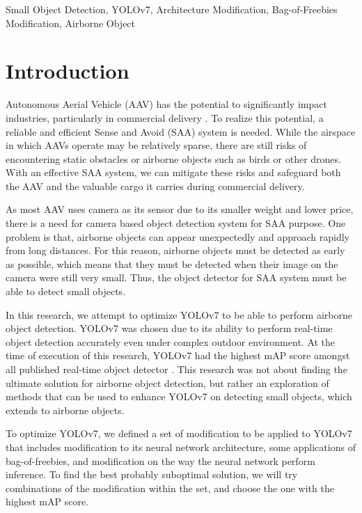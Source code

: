 \documentclass[conference]{IEEEtran}
\begin{document}
\begin{IEEEkeywords}
Small Object Detection, YOLOv7, Architecture Modification, Bag-of-Freebies Modification, Airborne Object
\end{IEEEkeywords}

\section{Introduction}

Autonomous Aerial Vehicle (AAV) has the potential to significantly impact industries, particularly in commercial delivery \cite{prime_air}.
To realize this potential, a reliable and efficient Sense and Avoid (SAA) system is needed.
While the airspace in which AAVs operate may be relatively sparse, there are still risks of encountering static obstacles or airborne objects such as birds or other drones.
With an effective SAA system, we can mitigate these risks and safeguard both the AAV and the valuable cargo it carries during commercial delivery.

As most AAV uses camera as its sensor due to its smaller weight and lower price, 
there is a need for camera based object detection system for SAA purpose.
One problem is that, airborne objects can appear unexpectedly and approach rapidly from
long distances. For this reason, airborne objects must be detected as early as possible, which means
that they must be detected when their image on the camera were still very small. 
Thus, the object detector for SAA system must be able to detect small objects.

In this research, we attempt to optimize YOLOv7 to be able to perform airborne
object detection. YOLOv7 was chosen due to its ability to perform real-time
object detection accurately even under complex outdoor environment. 
At the time of execution of this research, YOLOv7 had the highest mAP score amongst all published real-time object detector \cite{yolov7}.
This research was not about finding the ultimate solution for airborne object detection, but rather an exploration of methods that can be used
to enhance YOLOv7 on detecting small objects, which extends to airborne objects.

To optimize YOLOv7, we defined a set of modification to be applied to YOLOv7
that includes modification to its neural network architecture, some applications
of bag-of-freebies, and modification on the way the neural network perform inference. 
To find the best probably suboptimal solution, we will try combinations of the modification within the set, and choose the one with the highest mAP score.
\end{document}

